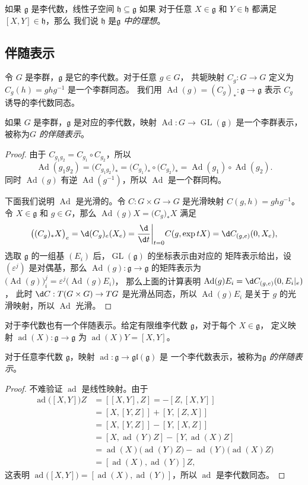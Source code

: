 \documentclass[fontset=none]{Notes}
\DeclareMathOperator\Ad{Ad}
\DeclareMathOperator\ad{ad}
\DeclareMathOperator\GL{GL}
\newcommand{\lie}[1]{\mathfrak{#1}}
\begin{document}
如果 $\lie g$ 是李代数，线性子空间 $\lie h\subseteq \lie g$ 如果
对于任意 $X\in\lie g$ 和 $Y\in\lie h$ 都满足 $[X,Y]\in\lie h$，那么
我们说 $\lie h$ 是\emph{$\lie g$ 中的理想}。

\subsection{伴随表示}

令 $G$ 是李群，$\lie g$ 是它的李代数。对于任意 $g\in G$，
共轭映射 $C_g:G\to G$ 定义为 $C_g(h)=ghg^{-1}$ 是一个李群同态。
我们用 $\Ad(g)=(C_g)_*:\lie g\to \lie g$ 表示 $C_g$ 诱导的李代数同态。

\begin{proposition}[伴随表示]
  如果 $G$ 是李群，$\lie g$ 是对应的李代数，映射 $\Ad:G\to \GL(\lie g)$
  是一个李群表示，被称为\emph{$G$ 的伴随表示}。
\end{proposition}
\begin{proof}
  由于 $C_{g_1g_2}=C_{g_1}\circ C_{g_2}$，所以
  \[
    \Ad(g_1g_2)=\bigl(C_{g_1g_2}\bigr)_*=\bigl(C_{g_1}\bigr)_*\circ\bigl(C_{g_2}\bigr)_*=
    \Ad(g_1)\circ \Ad(g_2).
  \]
  同时 $\Ad(g)$ 有逆 $\Ad(g^{-1})$，所以 $\Ad$ 是一个群同构。

  下面我们说明 $\Ad$ 是光滑的。令 $C:G\times G\to G$ 是光滑映射
  $C(g,h)=ghg^{-1}$。令 $X\in\lie g$ 和 $g\in G$，那么 $\Ad(g)X=\bigl(C_g\bigr)_*X$
  满足
  \[
    \bigl((C_g)_*X\bigr)_e=\d(C_g)_e(X_e)=
    \frac{\d}{\d t}\bigg|_{t=0}C(g,\exp tX)=
    \d C_{(g,e)}(0,X_e),
  \]
  选取 $\lie g$ 的一组基 $(E_i)$ 后，$\GL(\lie g)$ 的坐标表示由对应的
  矩阵表示给出，设 $(\varepsilon^j)$ 是对偶基，那么 $\Ad(g):\lie g\to\lie g$
  的矩阵表示为 $\bigl(\Ad(g)\bigr)_i^j=\varepsilon^j\bigl(\Ad(g)E_i\bigr)$，
  那么上面的计算表明 $\Ad(g)E_i=\d C_{(g,e)}(0,E_i|_e)$，
  此时 $\d C:T(G\times G)\to TG$ 是光滑丛同态，所以 $\Ad(g)E_i$
  是关于 $g$ 的光滑映射，所以 $\Ad$ 光滑。 
\end{proof}

对于李代数也有一个伴随表示。给定有限维李代数 $\lie g$，对于每个 $X\in \lie g$，
定义映射 $\ad(X):\lie g\to \lie g$ 为 $\ad(X)Y=[X,Y]$。

\begin{proposition}
  对于任意李代数 $\lie g$，映射 $\ad:\lie g\to\lie{gl}(\lie g)$ 是
  一个李代数表示，被称为\emph{$\lie g$ 的伴随表示}。
\end{proposition}
\begin{proof}
  不难验证 $\ad$ 是线性映射。由于
  \begin{align*}
    \ad\bigl([X,Y]\bigr)Z&=[[X,Y],Z]=-[Z,[X,Y]]\\
    &=[X,[Y,Z]]+[Y,[Z,X]]\\
    &=[X,[Y,Z]]-[Y,[X,Z]]\\
    &=[X,\ad(Y)Z]-[Y,\ad(X)Z]\\
    &=\ad(X)\bigl(\ad(Y)Z\bigr)
    -\ad(Y)\bigl(\ad(X)Z\bigr)\\
    &=[\ad(X),\ad(Y)]Z,
  \end{align*}
  这表明 $\ad\bigl([X,Y]\bigr)=[\ad(X),\ad(Y)]$，所以 $\ad$ 是李代数同态。
\end{proof}
\end{document}
